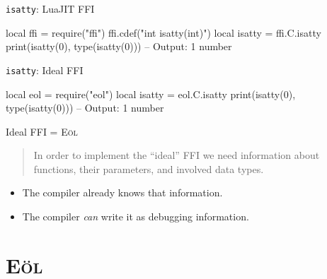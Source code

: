 \documentclass[luatex]{beamer}
\begin{document}
\begin{frame}[fragile]{\texttt{isatty}: LuaJIT FFI}
\begin{luacode}
	local ffi = require("ffi")
	ffi.cdef("int isatty(int)")
	local isatty = ffi.C.isatty
	print(isatty(0), type(isatty(0)))
	-- Output: 1 number
\end{luacode}


\end{frame}


\begin{frame}[fragile]{\texttt{isatty}: Ideal FFI}
\begin{luacode}
	local eol = require("eol")
	local isatty = eol.C.isatty
	print(isatty(0), type(isatty(0)))
	-- Output: 1 number
\end{luacode}

\hspace{4em}

\end{frame}


\begin{frame}{Ideal FFI = \textsc{Eöl}}
	\begin{quote}
		In order to implement the “ideal” FFI we need information
		about functions, their parameters, and involved data types.
	\end{quote}
	\pause
	\begin{itemize}
		\item The compiler already knows that information.
		\pause
		\item The compiler \emph{can} write it as debugging information.
	\end{itemize}
\end{frame}


\section{\textsc{Eöl}}
\end{document}
